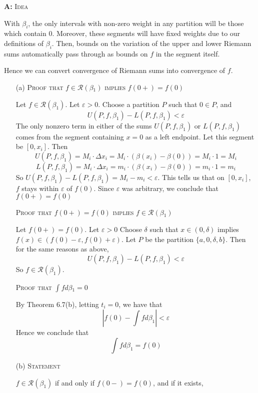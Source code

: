 \documentclass{article}
\newenvironment{Answer} {\par\noindent\textbf{A:}} {}
\begin{document}
\begin{Answer}
        \textsc{Idea}

        With $\beta_i$, the only intervals with non-zero weight in any partition will be those which contain $0$. Moreover, these segments will have fixed weights due to our definitions of $\beta_i$. Then, bounds on the variation of the upper and lower Riemann sums automatically pass through as bounds on $f$ in the segment itself.

        Hence we can convert convergence of Riemann sums into convergence of $f$.
    \begin{itemize}
        \item [(a)]
        \textsc{Proof that $f \in \mathscr{R}(\beta_1)$ implies $f(0+) = f(0)$}

        Let $f \in \mathscr{R}(\beta_1)$. Let $\varepsilon > 0$. Choose a partition $P$ such that $0 \in P$, and
        \[U(P, f, \beta_1) - L(P, f, \beta_1) < \varepsilon\]
        The only nonzero term in either of the sums $U(P,f,\beta_1)$ or $L(P,f,\beta_1)$ comes from the segment containing $x = 0$ as a left endpoint. Let this segment be $[0, x_i]$. Then 
        \[U(P, f, \beta_1) = M_i \cdot \Delta x_i = M_i \cdot (\beta(x_i) - \beta(0)) = M_i \cdot 1 = M_i\]
        \[L(P, f, \beta_1) = M_i \cdot \Delta x_i = m_i \cdot (\beta(x_i) - \beta(0)) = m_i \cdot 1 = m_i\]
        So $U(P, f, \beta_1) - L(P, f, \beta_1) = M_i - m_i < \varepsilon$. This tells us that on $[0, x_i]$, $f$ stays within $\varepsilon$ of $f(0)$. Since $\varepsilon$ was arbitrary, we conclude that $f(0+) = f(0)$
        
        \textsc{Proof that $f(0+) = f(0)$ implies $f \in \mathscr{R}(\beta_1)$}

        Let $f(0+) = f(0)$. Let $\varepsilon > 0$ Choose $\delta$ such that $x \in (0, \delta)$ implies $f(x) \in (f(0) - \varepsilon, f(0) + \varepsilon)$. Let $P$ be the partition $\{a, 0, \delta, b\}$. Then for the same reasons as above,
        \[U(P, f, \beta_1) - L(P, f, \beta_1) < \varepsilon\]
        So $f \in \mathscr{R}(\beta_1)$.

        \textsc{Proof that $\int fd\beta_1 = 0$}

        By Theorem 6.7(b), letting $t_i = 0$, we have that
        \[\left|f(0) - \int f d\beta_1 \right| < \varepsilon\]
        Hence we conclude that
        \[\int f d\beta_1 = f(0)\]
        \item [(b)] 
            \textsc{Statement}

            $f \in \mathscr{R}(\beta_1)$ if and only if $f(0-) = f(0)$, and if it exists,


\end{itemize}
\end{Answer}
\end{document}
